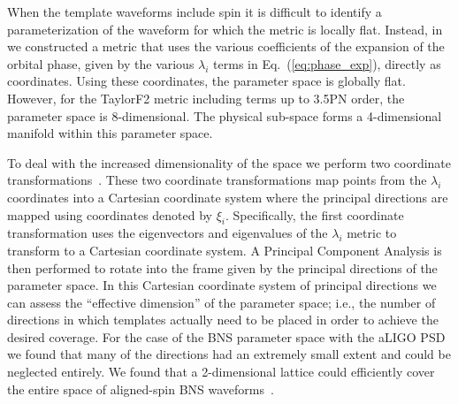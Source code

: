 When the template waveforms include spin it is difficult to identify a
parameterization of the waveform for which the metric is locally flat.
Instead, in~\cite{Brown:2012qf} we constructed a metric
that uses the various coefficients of the expansion of the orbital
phase, given by the various $\lambda_i$ terms in Eq.~(\ref{eq:phase_exp}),
directly as coordinates. Using these coordinates, the parameter space is
globally flat. However, for the TaylorF2 metric including terms up to
3.5\ac{PN} order, the parameter space is 8-dimensional. The physical 
sub-space forms a 4-dimensional manifold within this parameter 
space.

To deal with the increased dimensionality of the space we perform two
coordinate transformations~\cite{Brown:2012qf,Ohme:2013nsa}. These two 
coordinate
transformations map points from the $\lambda_i$ coordinates into a
Cartesian coordinate system where the principal directions are mapped using
coordinates denoted by $\xi_i$. Specifically, the first coordinate 
transformation uses the eigenvectors and
eigenvalues of the $\lambda_i$ metric to transform to a Cartesian
coordinate system. A Principal Component Analysis is then performed to rotate
into the frame given by the principal directions of the parameter space. In 
this Cartesian coordinate system of principal directions we can
assess the ``effective dimension'' of the parameter space; i.e., the number of
directions in which templates actually need to be placed in order to achieve the
desired coverage. For the case of the \ac{BNS} parameter space with the 
\ac{aLIGO} \ac{PSD} we found that many of the directions had an extremely small 
extent and
could be neglected entirely. We found that a 2-dimensional lattice could
efficiently cover the entire space of aligned-spin \ac{BNS}
waveforms~\cite{Brown:2012qf}.

